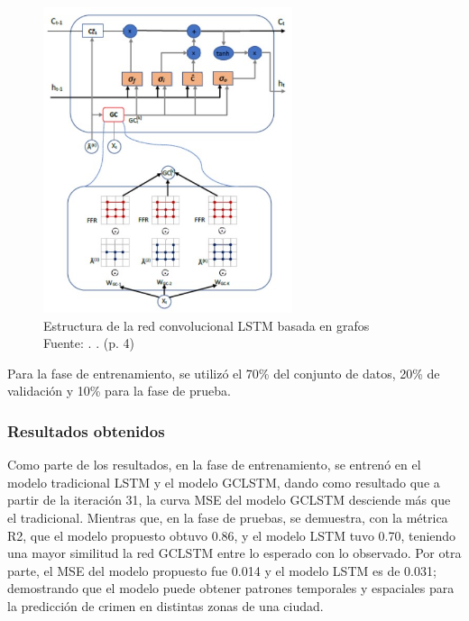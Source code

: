 
\begin{figure}[h]
	\begin{center}
		\includegraphics[width=0.65\textwidth]{2/figures/EsquivelRed.jpg}
		\caption{Estructura de la red convolucional LSTM basada en grafos \\
			Fuente: \citep*{pr_esquivel}. . (p. 4)}
		\label{1:fig2}
	\end{center}
\end{figure}

Para la fase de entrenamiento, se utilizó el 70\% del conjunto de datos, 20\% de validación y 10\% para la fase de prueba.

\subsubsection{Resultados obtenidos}
Como parte de los resultados, en la fase de entrenamiento, se entrenó en el modelo tradicional LSTM y el modelo GCLSTM, dando como resultado que a partir de la iteración 31, la curva MSE del modelo GCLSTM desciende más que el tradicional. 
Mientras que, en la fase de pruebas, se demuestra, con la métrica R2, que el modelo propuesto obtuvo 0.86, y el modelo LSTM tuvo 0.70, teniendo una mayor similitud la red GCLSTM entre lo esperado con lo observado. Por otra parte, el MSE del modelo propuesto fue 0.014 y el modelo LSTM es de 0.031; demostrando que el modelo puede obtener patrones temporales y espaciales para la predicción de crimen en distintas zonas de una ciudad. 

